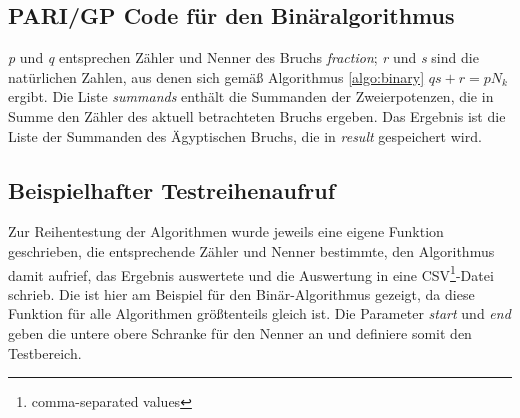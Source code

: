 \subsection{PARI/GP Code für den Binäralgorithmus}
\emph{p} und \emph{q} entsprechen Zähler und Nenner des Bruchs \emph{fraction}; \emph{r} und \emph{s} sind die natürlichen Zahlen, aus denen sich gemäß Algorithmus \ref{algo:binary} $qs+r = pN_k$ ergibt. Die Liste \emph{summands} enthält die Summanden der Zweierpotenzen, die in Summe den Zähler des aktuell betrachteten Bruchs ergeben. Das Ergebnis ist die Liste der Summanden des Ägyptischen Bruchs, die in \emph{result} gespeichert wird.



\subsection{Beispielhafter Testreihenaufruf}
Zur Reihentestung der Algorithmen wurde jeweils eine eigene Funktion geschrieben, die entsprechende Zähler und Nenner bestimmte, den Algorithmus damit aufrief, das Ergebnis auswertete und die Auswertung in eine CSV\footnote{comma-separated values}-Datei schrieb. Die ist hier am Beispiel für den Binär-Algorithmus gezeigt, da diese Funktion für alle Algorithmen größtenteils gleich ist. Die Parameter \emph{start} und \emph{end} geben die untere \bzw obere Schranke für den Nenner an und definiere somit den Testbereich.
